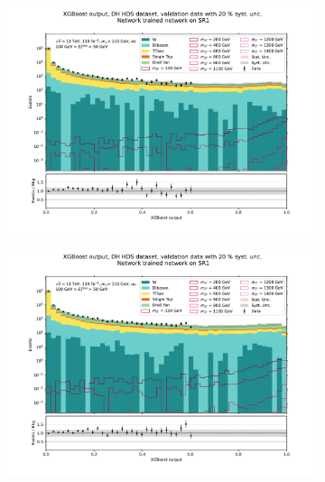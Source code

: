 \documentclass[12pt, a4paper]{book}
\begin{document}
\begin{figure}[!ht]
	\centering
	\begin{subfigure}[b]{0.49\textwidth}
      \centering
      \includegraphics[width=1\textwidth]{XGBoost/Model_independent/50-100/DH_HDS/VAL_ee.pdf}
   \end{subfigure}
   \hfill
   \begin{subfigure}[b]{0.49\textwidth}
      \centering
      \includegraphics[width=1\textwidth]{XGBoost/Model_independent/50-100/DH_HDS/VAL_uu.pdf}
   \end{subfigure}
   \hfill
   \begin{subfigure}[b]{0.49\textwidth}
      \centering

\end{subfigure}
\end{figure}
\end{document}
